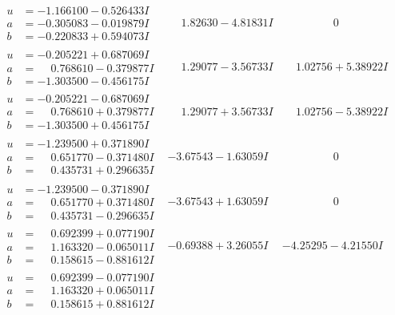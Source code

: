\documentclass[1p]{elsarticle_modified}
\theoremstyle{definition}
\begin{document}
$$\begin{array}{c|c|c}
\begin{aligned}
u &= -1.166100 - 0.526433 I \\
a &= -0.305083 - 0.019879 I \\
b &= -0.220833 + 0.594073 I\end{aligned}
 & \phantom{-}1.82630 - 4.81831 I & \phantom{-0.000000 } 0 \\ \hline\begin{aligned}
u &= -0.205221 + 0.687069 I \\
a &= \phantom{-}0.768610 - 0.379877 I \\
b &= -1.303500 - 0.456175 I\end{aligned}
 & \phantom{-}1.29077 - 3.56733 I & \phantom{-}1.02756 + 5.38922 I \\ \hline\begin{aligned}
u &= -0.205221 - 0.687069 I \\
a &= \phantom{-}0.768610 + 0.379877 I \\
b &= -1.303500 + 0.456175 I\end{aligned}
 & \phantom{-}1.29077 + 3.56733 I & \phantom{-}1.02756 - 5.38922 I \\ \hline\begin{aligned}
u &= -1.239500 + 0.371890 I \\
a &= \phantom{-}0.651770 - 0.371480 I \\
b &= \phantom{-}0.435731 + 0.296635 I\end{aligned}
 & -3.67543 - 1.63059 I & \phantom{-0.000000 } 0 \\ \hline\begin{aligned}
u &= -1.239500 - 0.371890 I \\
a &= \phantom{-}0.651770 + 0.371480 I \\
b &= \phantom{-}0.435731 - 0.296635 I\end{aligned}
 & -3.67543 + 1.63059 I & \phantom{-0.000000 } 0 \\ \hline\begin{aligned}
u &= \phantom{-}0.692399 + 0.077190 I \\
a &= \phantom{-}1.163320 - 0.065011 I \\
b &= \phantom{-}0.158615 - 0.881612 I\end{aligned}
 & -0.69388 + 3.26055 I & -4.25295 - 4.21550 I \\ \hline\begin{aligned}
u &= \phantom{-}0.692399 - 0.077190 I \\
a &= \phantom{-}1.163320 + 0.065011 I \\
b &= \phantom{-}0.158615 + 0.881612 I\end{aligned}

\end{array}$$
\end{document}
